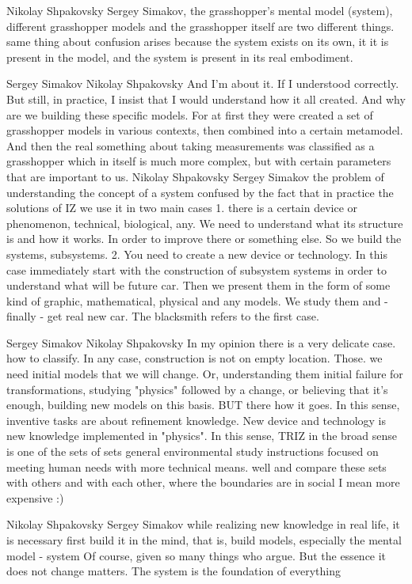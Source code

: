 \documentclass[11pt,a4paper]{article}
\begin{document}
Nikolay Shpakovsky Sergey Simakov, the grasshopper’s mental model (system),
different grasshopper models and the grasshopper itself are two different
things. same thing about confusion arises because the system exists on its
own, it it is present in the model, and the system is present in its real
embodiment.

Sergey Simakov Nikolay Shpakovsky And I'm about it. If I understood correctly.
But still, in practice, I insist that I would understand how it all
created. And why are we building these specific models. For at first they were
created a set of grasshopper models in various contexts, then combined into a
certain metamodel. And then the real something about taking measurements was
classified as a grasshopper which in itself is much more complex, but with
certain parameters that are important to us.  Nikolay Shpakovsky Sergey
Simakov the problem of understanding the concept of a system confused by the
fact that in practice the solutions of IZ we use it in two main cases 1. there
is a certain device or phenomenon, technical, biological, any. We need to
understand what its structure is and how it works. In order to improve there
or something else. So we build the systems, subsystems. 2. You need to create
a new device or technology. In this case immediately start with the
construction of subsystem systems in order to understand what will be future
car. Then we present them in the form of some kind of graphic, mathematical,
physical and any models. We study them and - finally - get real new car. The
blacksmith refers to the first case.

Sergey Simakov Nikolay Shpakovsky In my opinion there is a very delicate
case. how to classify. In any case, construction is not on empty
location. Those. we need initial models that we will change. Or, understanding
them initial failure for transformations, studying "physics" followed by a
change, or believing that it’s enough, building new models on this basis. BUT
there how it goes. In this sense, inventive tasks are about refinement
knowledge. New device and technology is new knowledge implemented in
"physics". In this sense, TRIZ in the broad sense is one of the sets of sets
general environmental study instructions focused on meeting human needs with
more technical means. well and compare these sets with others and with each
other, where the boundaries are in social I mean more expensive :)

Nikolay Shpakovsky Sergey Simakov while realizing new knowledge in real life,
it is necessary first build it in the mind, that is, build models, especially
the mental model - system Of course, given so many things who argue. But the
essence it does not change matters. The system is the foundation of everything
\end{document}
